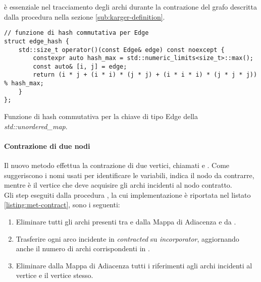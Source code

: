 \noindent {} è essenziale nel tracciamento degli archi durante la contrazione del grafo descritta dalla procedura   nella sezione \ref{sub:karger-definition}.\\

\begin{listing}[!ht]
\begin{verbatim}
// funzione di hash commutativa per Edge
struct edge_hash {
    std::size_t operator()(const Edge& edge) const noexcept {
        constexpr auto hash_max = std::numeric_limits<size_t>::max();
        const auto& [i, j] = edge;
        return (i * j + (i * i) * (j * j) + (i * i * i) * (j * j * j)) % hash_max;
    }
};
\end{verbatim}
\caption{Funzione di hash commutativa per la chiave di tipo Edge della \textit{std::unordered\_map}.}
\label{listing:hash-fun}
\end{listing}

\paragraph{Contrazione di due nodi}
\label{par:contraction}

Il nuovo metodo  effettua la contrazione di due vertici, chiamati  e . Come suggeriscono i nomi usati per identificare le variabili,  indica il nodo da contrarre, mentre  è il vertice che deve acquisire gli archi incidenti al nodo contratto. \\

\noindent Gli step eseguiti dalla procedura , la cui implementazione è riportata nel listato \ref{listing:met-contract}, sono i seguenti:

\begin{enumerate}
    \item Eliminare tutti gli archi presenti tra
       e  dalla Mappa di Adiacenza e da .

    \item Trasferire ogni arco incidente in
      \textit{contracted} su \textit{incorporator}, aggiornando anche il numero di archi corrispondenti in .

    \item Eliminare dalla Mappa di Adiacenza tutti i riferimenti agli archi incidenti al vertice  e il vertice stesso.
\end{enumerate}

